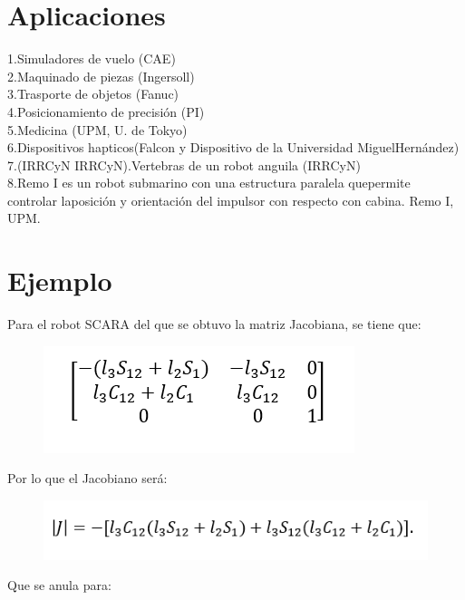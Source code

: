 \documentclass[11pt,a4paper,oldfontcommands,oneside]{memoir}
\begin{document}
\section{Aplicaciones}
1.Simuladores de vuelo (CAE)\\
2.Maquinado de piezas (Ingersoll) \\
3.Trasporte de objetos (Fanuc) \\
4.Posicionamiento de precisión (PI) \\
5.Medicina (UPM, U. de Tokyo) \\
6.Dispositivos hapticos(Falcon y Dispositivo de la Universidad MiguelHernández)\\
7.(IRRCyN IRRCyN).Vertebras de un robot anguila (IRRCyN)\\
8.Remo I es un robot submarino con una estructura paralela quepermite controlar laposición y orientación del impulsor con respecto con cabina. Remo I, UPM.\\



 
\section{Ejemplo}
Para el robot SCARA del que se obtuvo la matriz Jacobiana, se tiene que:
\begin{figure}[h]
\includegraphics[scale=.9]{link1.png}
\end{figure}
Por lo que el Jacobiano será:
\begin{figure}[h]
\includegraphics[scale=.9]{link2.png}
\end{figure}

Que se anula para:
\end{document}

